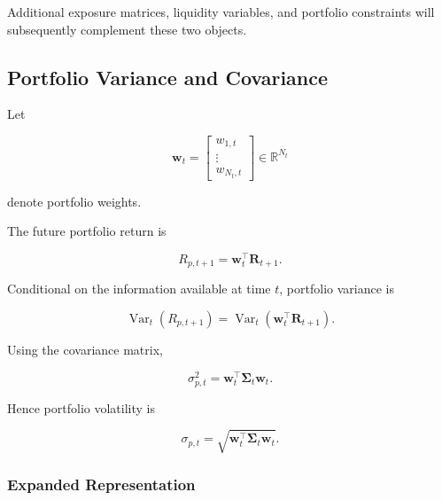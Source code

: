 \documentclass[11pt,a4paper]{article}
\begin{document}
Additional exposure matrices, liquidity variables, and portfolio constraints
will subsequently complement these two objects.


\subsection{Portfolio Variance and Covariance}
\label{subsec:portfolio_variance_covariance}

Let

\begin{equation}
\mathbf{w}_t
=
\begin{bmatrix}
w_{1,t}\\
\vdots\\
w_{N_t,t}
\end{bmatrix}
\in
\mathbb{R}^{N_t}
\end{equation}

denote portfolio weights.

The future portfolio return is

\begin{equation}
\boxed{
R_{p,t+1}
=
\mathbf{w}_t^{\top}
\mathbf{R}_{t+1}.
}
\end{equation}

Conditional on the information available at time $t$, portfolio variance is

\begin{equation}
\operatorname{Var}_t
\left(
R_{p,t+1}
\right)
=
\operatorname{Var}_t
\left(
\mathbf{w}_t^\top
\mathbf{R}_{t+1}
\right).
\end{equation}

Using the covariance matrix,

\begin{equation}
\boxed{
\sigma_{p,t}^{2}
=
\mathbf{w}_t^\top
\boldsymbol{\Sigma}_t
\mathbf{w}_t.
}
\end{equation}

Hence portfolio volatility is

\begin{equation}
\boxed{
\sigma_{p,t}
=
\sqrt{
\mathbf{w}_t^\top
\boldsymbol{\Sigma}_t
\mathbf{w}_t
}.
}
\end{equation}


\subsubsection{Expanded Representation}
\end{document}
